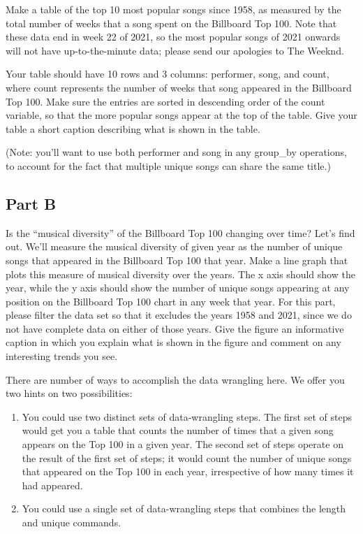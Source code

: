 \documentclass[
]{article}
\begin{document}
Make a table of the top 10 most popular songs since 1958, as measured by
the total number of weeks that a song spent on the Billboard Top 100.
Note that these data end in week 22 of 2021, so the most popular songs
of 2021 onwards will not have up-to-the-minute data; please send our
apologies to The Weeknd.

Your table should have 10 rows and 3 columns: performer, song, and
count, where count represents the number of weeks that song appeared in
the Billboard Top 100. Make sure the entries are sorted in descending
order of the count variable, so that the more popular songs appear at
the top of the table. Give your table a short caption describing what is
shown in the table.

(Note: you'll want to use both performer and song in any group\_by
operations, to account for the fact that multiple unique songs can share
the same title.)

\hypertarget{part-b-1}{%
\subsection{Part B}\label{part-b-1}}

Is the ``musical diversity'' of the Billboard Top 100 changing over
time? Let's find out. We'll measure the musical diversity of given year
as the number of unique songs that appeared in the Billboard Top 100
that year. Make a line graph that plots this measure of musical
diversity over the years. The x axis should show the year, while the y
axis should show the number of unique songs appearing at any position on
the Billboard Top 100 chart in any week that year. For this part, please
filter the data set so that it excludes the years 1958 and 2021, since
we do not have complete data on either of those years. Give the figure
an informative caption in which you explain what is shown in the figure
and comment on any interesting trends you see.

There are number of ways to accomplish the data wrangling here. We offer
you two hints on two possibilities:

\begin{enumerate}
\def\labelenumi{\arabic{enumi})}
\item
  You could use two distinct sets of data-wrangling steps. The first set
  of steps would get you a table that counts the number of times that a
  given song appears on the Top 100 in a given year. The second set of
  steps operate on the result of the first set of steps; it would count
  the number of unique songs that appeared on the Top 100 in each year,
  irrespective of how many times it had appeared.
\item
  You could use a single set of data-wrangling steps that combines the
  length and unique commands.
\end{enumerate}
\end{document}
